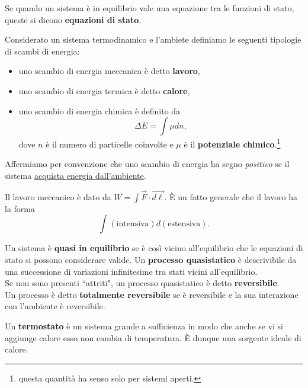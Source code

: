 \begin{definition}
Se quando un sistema \`e in equilibrio vale una equazione tra le funzioni di stato, queste si dicono \textbf{equazioni di stato}.
\end{definition}

\begin{definition}
Considerato un sistema termodinamico e l'ambiete definiamo le seguenti tipologie di scambi di energia:
\begin{itemize}
\item uno scambio di energia meccanica \`e detto \textbf{lavoro},
\item uno scambio di energia termica \`e detto \textbf{calore},
\item uno scambio di energia chimica \`e definito da \[\Delta E=\int \mu dn,\] dove $n$ \`e il numero di particelle coinvolte e $\mu$ \`e il \textbf{potenziale chimico}.\footnote{questa quantit\`a ha senso solo per sistemi aperti.}
\end{itemize}
Affermiamo per convenzione che uno scambio di energia ha segno \textit{positivo} se il sistema \underline{acquista energia dall'ambiente}.
\end{definition}

\begin{remark}
Il lavoro meccanico \`e dato da $W=\int \vec F\cdot \vec{d\ell}$. \`E un fatto generale che il lavoro ha la forma
\[\int(\text{intensiva})d(\text{estensiva}).\]
\end{remark}



\begin{definition}
Un sistema \`e \textbf{quasi in equilibrio} se \`e cos\`i vicino all'equilibrio che le equazioni di stato si possono considerare valide. Un \textbf{processo quasistatico} \`e descrivibile da una successione di variazioni infinitesime tra stati vicini all'equilibrio.\\
Se non sono presenti ``attriti", un processo quasistatico \`e detto \textbf{reversibile}.\\
Un processo \`e detto \textbf{totalmente reversibile} se \`e reversibile e la sua interazione con l'ambiente \`e reversibile.
\end{definition}

\begin{definition}[Termostato]
Un \textbf{termostato} \`e un sistema grande a sufficienza in modo che anche se vi si aggiunge calore esso non cambia di temperatura. \`E dunque una sorgente ideale di calore.
\end{definition}

